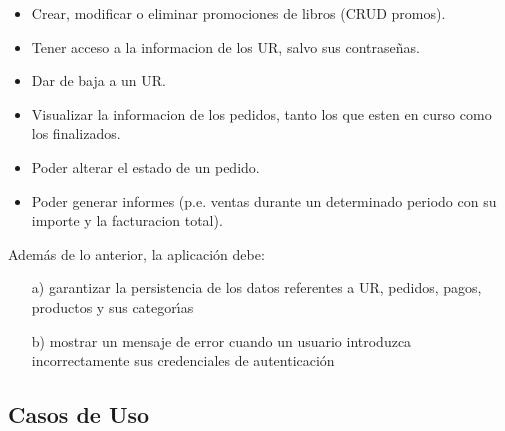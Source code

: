 \documentclass[a4paper]{report}
\begin{document}
\begin{enumerate}
\begin{itemize}
                    \item Crear, modificar o eliminar promociones de libros (CRUD promos).
                    \item Tener acceso a la informacion de los UR, salvo sus contrase\~nas.
                    \item Dar de baja a un UR.
                    \item Visualizar la informacion de los pedidos, tanto los que esten en curso como los finalizados.
                    \item Poder alterar el estado de un pedido.
                    \item Poder generar informes (p.e. ventas durante un determinado periodo con su importe y la facturacion total).
                \end{itemize}
            \end{enumerate}

            Adem\'as de lo anterior, la aplicaci\'on debe:
            \begin{enumerate}
                \item[a)] garantizar la persistencia de los datos referentes a UR, pedidos, pagos, productos y sus categor\'\i{}as
                \item[b)] mostrar un mensaje de error cuando un usuario introduzca incorrectamente sus credenciales de autenticaci\'on
            \end{enumerate}

        \subsection{Casos de Uso}\label{subsec:casos-de-uso}
\end{document}
